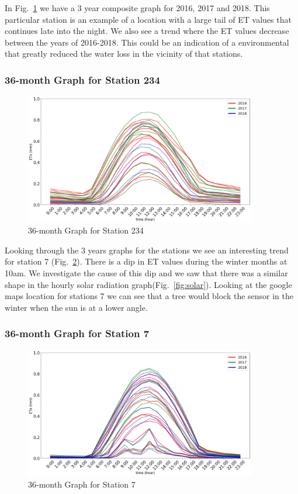 \begin{frame}
	In Fig.~\ref{fig:234multi} we have a 3 year composite graph for 2016, 2017 and 2018. This particular station is an example of a location with a large tail of ET values that continues late into the night. We also see a trend where the ET values decrease between the years of 2016-2018. This could be an indication of a environmental that greatly reduced the water loss in the vicinity of that stations.
\end{frame}

\begin{frame}
\frametitle{36-month Graph for Station 234}
\centering
\begin{figure}
	\includegraphics[width=0.9\textwidth]{images/234multi.png}
	\caption{36-month Graph for Station 234}\label{fig:234multi}
\end{figure}
\end{frame}

\begin{frame}
	Looking through the 3 years graphs for the stations we see an interesting trend for station 7 (Fig.~\ref{fig:7multi}). There is a dip in ET values during the winter months at 10am. We investigate the cause of this dip and we saw that there was a similar shape in the hourly solar radiation graph(Fig.~\ref{fig:solar}). Looking at the google maps location for stations 7 we can see that a tree would block the sensor in the winter when the sun is at a lower angle.
\end{frame}

\begin{frame}
\frametitle{36-month Graph for Station 7}
\centering
\begin{figure}
	\includegraphics[width=0.9\textwidth]{images/7multi.png}
	\caption{36-month Graph for Station 7}\label{fig:7multi}
\end{figure}
\end{frame}


